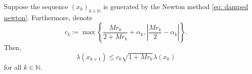 \documentclass[10pt,a4paper]{amsart}
\newcommand{\N}{\mathbb{N}}
\begin{document}
\begin{lemma} \label{lemma: newton's progress lambda}
Suppose the sequence $(x_k)_{k \in \N}$ is generated by the Newton method \eqref{eq: damped newton}. Furthermore, denote 
    \begin{equation} \label{eq: def c_k}
        c_k \coloneq \max \left\lbrace \frac{M r_k }{2 + M r_k} + \alpha_k, \left| \frac{ Mr_k}{2} - \alpha_k \right| \right\rbrace.
    \end{equation}
Then, 
\begin{equation}
    \lambda(x_{k+1}) \leq c_k \sqrt{1 + M r_k} \lambda(x_k) \label{ineq: newton's progress lambda}
\end{equation}
for all $k \in \N$.
\end{lemma}
\end{document}
